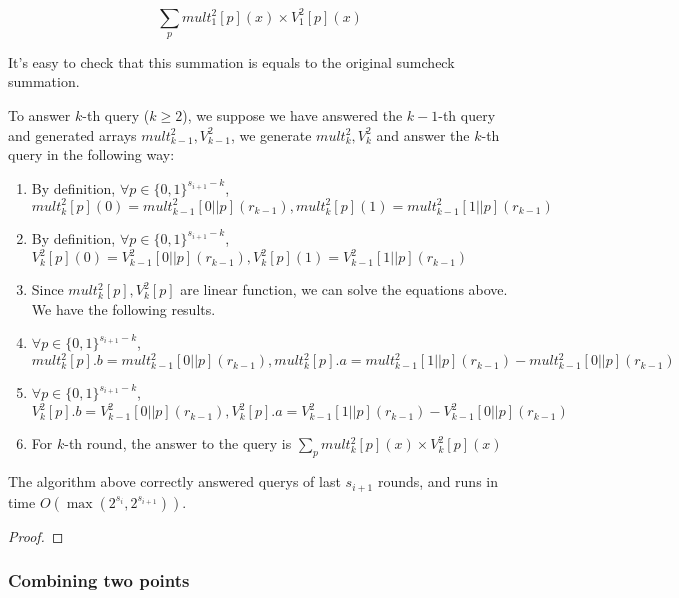 $$\sum_{p}mult_{1}^2[p](x)\times V_1^2[p](x)$$

It's easy to check that this summation is equals to the original sumcheck summation.

To answer $k$-th query ($k\ge 2$), we suppose we have answered the $k-1$-th query and generated arrays $mult_{k-1}^2, V_{k-1}^2$, we generate $mult_{k}^2, V_{k}^2$ and answer the $k$-th query in the following way:

\begin{enumerate}
	\item By definition, $\forall p \in {\{0, 1\}^{s_{i+1}-k}}$, $mult_{k}^2[p](0)=mult_{k-1}^2[0||p](r_{k-1}), mult_{k}^2[p](1)=mult_{k-1}^2[1||p](r_{k-1})$
	\item By definition, $\forall p \in {\{0, 1\}^{s_{i+1}-k}}$, $V_{k}^2[p](0)=V_{k-1}^2[0||p](r_{k-1}), V_{k}^2[p](1)=V_{k-1}^2[1||p](r_{k-1})$
	\item Since $mult_{k}^2[p], V_{k}^2[p]$ are linear function, we can solve the equations above. We have the following results.
	\item $\forall p \in {\{0, 1\}^{s_{i+1}-k}}$, $mult_{k}^2[p].b = mult_{k-1}^2[0||p](r_{k-1}), mult_{k}^2[p].a = mult_{k-1}^2[1||p](r_{k-1})-mult_{k-1}^2[0||p](r_{k-1})$
	\item $\forall p \in {\{0, 1\}^{s_{i+1}-k}}$, $V_{k}^2[p].b = V_{k-1}^2[0||p](r_{k-1}), V_{k}^2[p].a = V_{k-1}^2[1||p](r_{k-1})-V_{k-1}^2[0||p](r_{k-1})$
	\item For $k$-th round, the answer to the query is $\sum_{p} mult_{k}^2[p](x)\times V_{k}^2[p](x)$
\end{enumerate}

\begin{theorem} The algorithm above correctly answered querys of last $s_{i+1}$ rounds, and runs in time $O(\max(2^{s_{i}}, 2^{s_{i+1}}))$.
\end{theorem}

\begin{proof}
\end{proof}

\subsubsection{Combining two points}